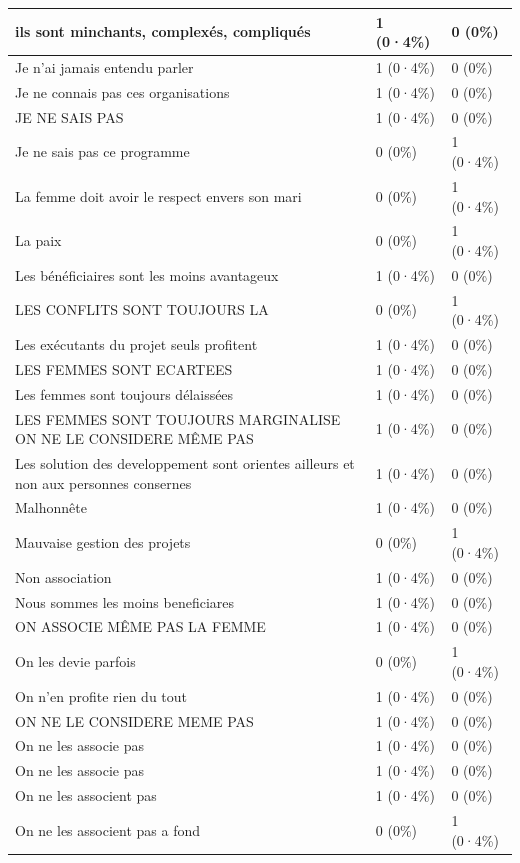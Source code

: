 \documentclass[
]{book}
\begin{document}
\begin{tabular}{l|l|l}
\hline
ils sont minchants, complexés, compliqués & 1 (0·4\%) & 0 (0\%)\\
\hline
Je n'ai jamais entendu parler & 1 (0·4\%) & 0 (0\%)\\
\hline
Je ne connais pas ces organisations & 1 (0·4\%) & 0 (0\%)\\
\hline
JE NE SAIS PAS & 1 (0·4\%) & 0 (0\%)\\
\hline
Je ne sais pas ce programme & 0 (0\%) & 1 (0·4\%)\\
\hline
La femme doit avoir le respect envers son mari & 0 (0\%) & 1 (0·4\%)\\
\hline
La paix & 0 (0\%) & 1 (0·4\%)\\
\hline
Les bénéficiaires sont les moins avantageux & 1 (0·4\%) & 0 (0\%)\\
\hline
LES CONFLITS SONT TOUJOURS LA & 0 (0\%) & 1 (0·4\%)\\
\hline
Les exécutants du projet seuls profitent & 1 (0·4\%) & 0 (0\%)\\
\hline
LES FEMMES SONT ECARTEES & 1 (0·4\%) & 0 (0\%)\\
\hline
Les femmes sont toujours délaissées & 1 (0·4\%) & 0 (0\%)\\
\hline
LES FEMMES SONT TOUJOURS MARGINALISE ON NE LE CONSIDERE MÊME PAS & 1 (0·4\%) & 0 (0\%)\\
\hline
Les solution des developpement sont orientes ailleurs et non aux personnes consernes & 1 (0·4\%) & 0 (0\%)\\
\hline
Malhonnête & 1 (0·4\%) & 0 (0\%)\\
\hline
Mauvaise gestion des projets & 0 (0\%) & 1 (0·4\%)\\
\hline
Non association & 1 (0·4\%) & 0 (0\%)\\
\hline
Nous sommes les moins beneficiares & 1 (0·4\%) & 0 (0\%)\\
\hline
ON ASSOCIE MÊME PAS LA FEMME & 1 (0·4\%) & 0 (0\%)\\
\hline
On les devie parfois & 0 (0\%) & 1 (0·4\%)\\
\hline
On n'en profite rien du tout & 1 (0·4\%) & 0 (0\%)\\
\hline
ON NE LE CONSIDERE MEME PAS & 1 (0·4\%) & 0 (0\%)\\
\hline
On ne les associe  pas & 1 (0·4\%) & 0 (0\%)\\
\hline
On ne les associe pas & 1 (0·4\%) & 0 (0\%)\\
\hline
On ne les associent pas & 1 (0·4\%) & 0 (0\%)\\
\hline
On ne les associent pas a fond & 0 (0\%) & 1 (0·4\%)\\

\end{tabular}
\end{document}
